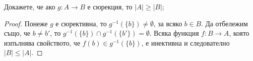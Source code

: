 \begin{problem}
  Докажете, че ако $g:A\rightarrow B$ е сюрекция, то $|A|\geq |B|$;
\end{problem}
\begin{proof}
  Понеже $g$ е сюрективна, то $g^{-1}(\{b\}) \neq \emptyset$, за всяко $b \in B$.
  Да отбележим също, че $b \neq b'$, то $g^{-1}(\{b\}) \cap g^{-1}(\{b'\}) = \emptyset$.
  Всяка функция $f:B\to A$, която изпълнява свойството, че $f(b) \in g^{-1}(\{b\})$,
  е инективна и следователно $|B| \leq |A|$.
\end{proof}




